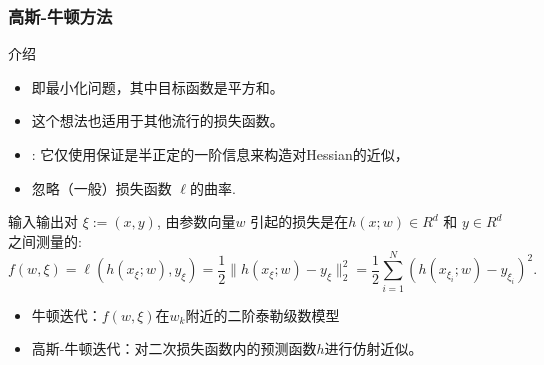 \documentclass[handout]{beamer}
\begin{document}
\begin{frame}[allowframebreaks]
\frametitle{高斯-牛顿方法}

介绍

\begin{itemize}
\item
  即最小化问题，其中目标函数是平方和。

\item  这个想法也适用于其他流行的损失函数。

\item
{}:  它仅使用保证是半正定的一阶信息来构造对Hessian的近似，

\item
{} %
忽略（一般）损失函数 $\ell$的曲率.
\end{itemize}

\framebreak

输入输出对 $\xi:=(x,y)$,
由参数向量$w$ 引起的损失是在$h(x;w)\in R^d$ 和 $y \in R^d$之间测量的:
$$
    f(w,\xi) = \ell(h(x_{\xi};w),y_{\xi}) = \frac{1}{2} \|h(x_{\xi};w) - y_{\xi}\|_2^2
    = \frac{1}{2} \sum_{i=1}^N (h(x_{\xi_i};w) - y_{\xi_i})^2.
$$

\begin{itemize}
\item 牛顿迭代：$f(w,\xi)$在$w_k$附近的二阶泰勒级数模型

\item 高斯-牛顿迭代：对二次损失函数内的预测函数$h$进行仿射近似。
\end{itemize}

\end{frame}
\end{document}
